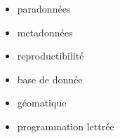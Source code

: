 \begin{itemize}
\item paradonnées
\item metadonnées
\item reproductibilité
\item base de donnée
\item géomatique
\item programmation lettrée
\end{itemize}
